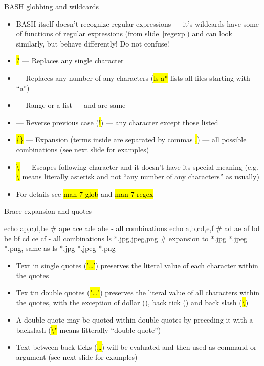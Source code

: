 \documentclass[compress, ucs, xelatex, 11pt, xcolor=svgnames,
  hyperref={
    bookmarks=true,
    unicode=true,
    colorlinks=true,
    pdftitle={Linux, command line and MetaCentrum},
    plainpages=false,
    pdfauthor={Vojtech Zeisek},
    pdfsubject={Course about use of Linux command line, writing shell scripts and using MetaCentrum of CESNET},
    pdfcreator={XeLaTeX},
    pdfkeywords={Linux, GNU, BASH, shell, command line, MetaCentrum},
    linkcolor=DarkRed,
    anchorcolor=DarkBlue,
    citecolor=Indigo,
    filecolor=NavyBlue,
    menucolor=DarkMagenta,
    urlcolor=DarkBlue,
    pdftex},
  url={hyphens, lowtilde} %
  ]{beamer}
\renewcommand{\texttt}[1]{\hl{\ttfamily #1}}
\begin{document}
\begin{frame}{BASH globbing and wildcards}
  \label{globbing}
  \begin{itemize}
    \item BASH itself doesn't recognize regular expressions --- it's wildcards have some of functions of regular expressions (from slide~\ref{regexp}) and can look similarly, but behave differently! Do not confuse!
    \item \texttt{?} --- Replaces any single character
    \item \texttt{*} --- Replaces any number of any characters (\texttt{ls a*} lists all files starting with ``a'')
    \item \texttt{[]} --- Range or a list --- \texttt{[abcdef]} and \texttt{[a-f]} are same
    \item \texttt{[!\ldots]} --- Reverse previous case (\texttt{!}) --- any character except those listed
    \item \texttt{\{\}} --- Expansion (terms inside are separated by commas \texttt{,}) --- all possible combinations (see next slide for examples)
    \item \texttt{\textbackslash} --- Escapes following character and it doesn't have its special meaning (e.g. \texttt{\textbackslash *} means literally asterisk \texttt{*} and not ``any number of any characters'' as usually)
    \item For details see \texttt{man 7 glob} and \texttt{man 7 regex}
  \end{itemize}
\end{frame}

\begin{frame}[fragile]{Brace expansion and quotes}
  \begin{bashcode}
    echo a{p,c,d,b}e # ape ace ade abe - all combinations
    echo {a,b,c}{d,e,f} # ad ae af bd be bf cd ce cf - all combinations
    ls *.{jpg,jpeg,png} # expansion to *.jpg *.jpeg *.png, same as
    ls *.jpg *.jpeg *.png
  \end{bashcode}
  \begin{itemize}
    \item Text in single quotes (\texttt{'\ldots'}) preserves the literal value of each character within the quotes
    \item Tex tin double quotes (\texttt{"\ldots"}) preserves the literal value of all characters within the quotes, with the exception of dollar (\texttt{\textdollar}), back tick (\texttt{\textasciigrave}) and back slash (\texttt{\textbackslash})
    \item A double quote may be quoted within double quotes by preceding it with a backslash (\texttt{\textbackslash"} means litterally ``double quote'')
    \item Text between back ticks (\texttt{\textasciigrave\ldots\textasciigrave}) will be evaluated and then used as command or argument (see next slide for examples)
  \end{itemize}
\end{frame}
\end{document}
